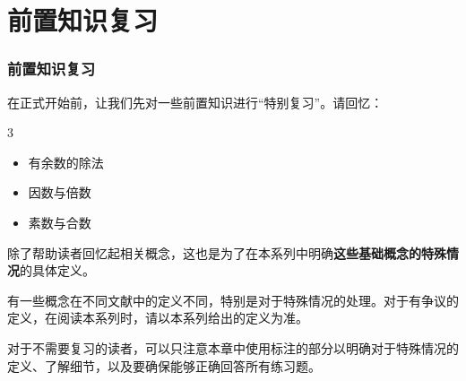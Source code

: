 
\section{前置知识复习}
\begin{frame}
  \frametitle{前置知识复习}
  在正式开始前，让我们先对一些前置知识进行“特别复习”。请回忆：
  \begin{mymulticols}[l][l]{3}
    \begin{itemize}
      \item 有余数的除法
      \item 因数与倍数
      \item 素数与合数
    \end{itemize}
  \end{mymulticols}
  \pause
  
  \emptyline
  除了帮助读者回忆起相关概念，这也是为了在本系列中明确\textbf{这些基础概念的特殊情况}的具体定义。
  
  有一些概念在不同文献中的定义不同，特别是对于特殊情况的处理。对于有争议的定义，在阅读本系列时，请以本系列给出的定义为准。
  \pause
  
  \emptyline
  对于不需要复习的读者，可以只注意本章中使用标注的部分以明确对于特殊情况的定义、了解细节，以及要确保能够正确回答所有练习题。
\end{frame}
